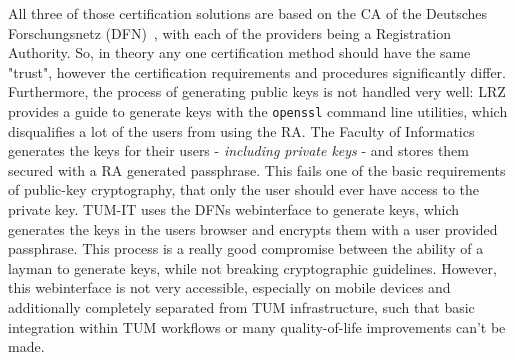All three of those certification solutions are based on the CA of the Deutsches Forschungsnetz (DFN)~\cite{dfnPki}, with
each of the providers being a Registration Authority.
So, in theory any one certification method should have the same "trust", however the certification requirements and
procedures significantly differ.
Furthermore, the process of generating public keys is not handled very well: LRZ provides a guide to generate keys with
the \lstinline{openssl} command line utilities, which disqualifies a lot of the users from using the RA\@.
The Faculty of Informatics generates the keys for their users - \emph{including private keys} - and stores them secured
with a RA generated passphrase.
This fails one of the basic requirements of public-key cryptography, that only the user should ever have access to the
private key.
TUM-IT uses the DFNs webinterface to generate keys, which generates the keys in the users browser and encrypts them with
a user provided passphrase.
This process is a really good compromise between the ability of a layman to generate keys, while not breaking
cryptographic guidelines.
However, this webinterface is not very accessible, especially on mobile devices and additionally completely separated
from TUM infrastructure, such that basic integration within TUM workflows or many quality-of-life improvements can't be
made.

